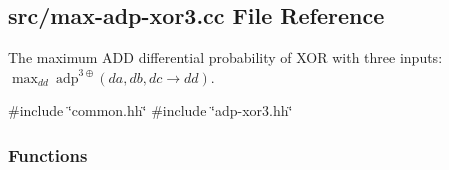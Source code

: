 \hypertarget{max-adp-xor3_8cc}{\subsection{src/max-\/adp-\/xor3.cc \-File \-Reference}
\label{max-adp-xor3_8cc}
}


\-The maximum \-A\-D\-D differential probability of \-X\-O\-R with three inputs\-: $\max_{dd}~\mathrm{adp}^{3\oplus}(da, db, dc \rightarrow dd)$.  


{\ttfamily \#include \char`\"{}common.\-hh\char`\"{}}\*
{\ttfamily \#include \char`\"{}adp-\/xor3.\-hh\char`\"{}}\*
\subsubsection*{\-Functions}
